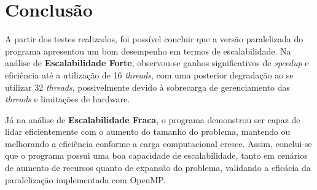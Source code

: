 \documentclass[a4paper, 12pt]{article}
\begin{document}
	 \section{Conclusão}
	 
	 \hspace{0.68cm}A partir dos testes realizados, foi possível concluir que a versão paralelizada do programa apresentou um bom desempenho em termos de escalabilidade. Na análise de \textbf{Escalabilidade Forte}, observou-se ganhos significativos de \textit{speedup} e eficiência até a utilização de 16 \textit{threads}, com uma posterior degradação ao se utilizar 32 \textit{threads}, possivelmente devido à sobrecarga de gerenciamento das \textit{threads} e limitações de hardware.
	 
	 Já na análise de \textbf{Escalabilidade Fraca}, o programa demonstrou ser capaz de lidar eficientemente com o aumento do tamanho do problema, mantendo ou melhorando a eficiência conforme a carga computacional cresce. Assim, conclui-se que o programa possui uma boa capacidade de escalabilidade, tanto em cenários de aumento de recursos quanto de expansão do problema, validando a eficácia da paralelização implementada com OpenMP.
	 
	 
	 
	 
	 
\end{document}
